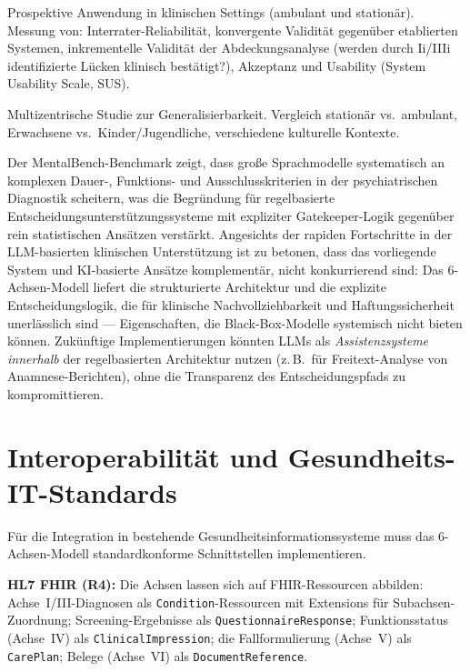 \documentclass[11pt,a4paper]{article}
\begin{document}
\begin{description}[style=nextline, leftmargin=1.5cm, font=\bfseries]
\item[Phase~3: Klinische Felderprobung (N=200+)] Prospektive Anwendung in klinischen Settings (ambulant und station\"ar). Messung von: Interrater-Reliabilit\"at, konvergente Validit\"at gegen\"uber etablierten Systemen, inkrementelle Validit\"at der Abdeckungsanalyse (werden durch Ii/IIIi identifizierte L\"ucken klinisch best\"atigt?), Akzeptanz und Usability (System Usability Scale, SUS).
\item[Phase~4: Multi-Site-Trial] Multizentrische Studie zur Generalisierbarkeit. Vergleich station\"ar vs.\ ambulant, Erwachsene vs.\ Kinder/Jugendliche, verschiedene kulturelle Kontexte.
\end{description}

Der MentalBench-Benchmark \citep{MentalBench2024} zeigt, dass gro\ss{}e Sprachmodelle systematisch an komplexen Dauer-, Funktions- und Ausschlusskriterien in der psychiatrischen Diagnostik scheitern, was die Begr\"undung f\"ur regelbasierte Entscheidungsunterst\"utzungssysteme mit expliziter Gatekeeper-Logik gegen\"uber rein statistischen Ans\"atzen verst\"arkt. Angesichts der rapiden Fortschritte in der LLM-basierten klinischen Unterst\"utzung ist zu betonen, dass das vorliegende System und KI-basierte Ans\"atze komplement\"ar, nicht konkurrierend sind: Das 6-Achsen-Modell liefert die strukturierte Architektur und die explizite Entscheidungslogik, die f\"ur klinische Nachvollziehbarkeit und Haftungssicherheit unerl\"asslich sind --- Eigenschaften, die Black-Box-Modelle systemisch nicht bieten k\"onnen. Zuk\"unftige Implementierungen k\"onnten LLMs als \textit{Assistenzsysteme innerhalb} der regelbasierten Architektur nutzen (z.\,B.\ f\"ur Freitext-Analyse von Anamnese-Berichten), ohne die Transparenz des Entscheidungspfads zu kompromittieren.


\section{Interoperabilit\"at und Gesundheits-IT-Standards}
\label{sec:interop}

F\"ur die Integration in bestehende Gesundheitsinformationssysteme muss das 6-Achsen-Modell standardkonforme Schnittstellen implementieren.

\textbf{HL7 FHIR (R4):} Die Achsen lassen sich auf FHIR-Ressourcen abbilden: Achse~I/III-Diagnosen als \texttt{Condition}-Ressourcen mit Extensions f\"ur Subachsen-Zuordnung; Screening-Ergebnisse als \texttt{QuestionnaireResponse}; Funktionsstatus (Achse~IV) als \texttt{ClinicalImpression}; die Fallformulierung (Achse~V) als \texttt{CarePlan}; Belege (Achse~VI) als \texttt{DocumentReference}.
\end{document}
